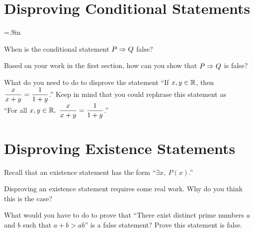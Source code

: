 \section{Disproving Conditional Statements}
\begin{question}[resume] \itemsep=.9in
\item When is the conditional statement $P \Rightarrow Q$ false?
\item Based on your work in the first section, how can you show that $P \Rightarrow Q$ is false?

\item What do you need to do to disprove the statement ``If $x,y \in \mathbb{R}$, then $\displaystyle \frac{x}{x+y} = \frac{1}{1+y}$.''  Keep in mind that you could rephrase this statement as \\``For all $\displaystyle  x,y \in \mathbb{R}, \ \frac{x}{x+y} = \frac{1}{1+y}$.''
\vspace{1in}
\end{question}

\section{Disproving Existence Statements}
Recall that an existence statement has the form ``$\exists x, \ P(x)$.''
\begin{question}[resume] \itemsep=1in
\item  Disproving an existence statement requires some real work.  Why do you think this is the case?
\item What would you have to do to prove that ``There exist distinct prime numbers $a$ and $b$ such that $a+b > ab$'' is a false statement?  Prove this statement is false.
\end{question}





